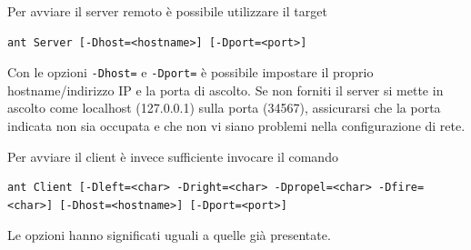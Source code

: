 \documentclass[a4paper,12pt]{article}
\begin{document}
Per avviare il server remoto \`e possibile utilizzare il target
\begin{lstlisting}[basicstyle=\ttfamily]
ant Server [-Dhost=<hostname>] [-Dport=<port>]
\end{lstlisting}

Con le opzioni \texttt{-Dhost=} e \texttt{-Dport=} \`e possibile impostare il proprio hostname/indirizzo IP e la porta di ascolto. Se non forniti il server si mette in ascolto come localhost (127.0.0.1) sulla porta (34567), assicurarsi che la porta indicata non sia occupata e che non vi siano problemi nella configurazione di rete.

Per avviare il client \`e invece sufficiente invocare il comando 
\begin{lstlisting}[basicstyle=\ttfamily]
ant Client [-Dleft=<char> -Dright=<char> -Dpropel=<char> -Dfire=<char>] [-Dhost=<hostname>] [-Dport=<port>]
\end{lstlisting}

Le opzioni hanno significati uguali a quelle gi\`a presentate.

\newpage
\listoffigures
\end{document}
